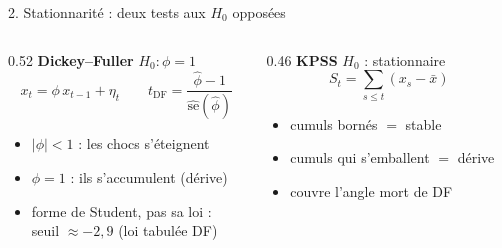 \documentclass[10pt]{beamer}
\begin{document}
\begin{frame}{2. Stationnarité : deux tests aux $H_0$ opposées}
  \begin{columns}[T]
    \begin{column}{0.52\textwidth}
      \small
      \textbf{Dickey--Fuller} \hfill {\footnotesize $H_0 : \phi=1$}
      \[
        x_t = \phi\,x_{t-1}+\eta_t
        \qquad
        t_{\mathrm{DF}} = \frac{\hat\phi - 1}{\widehat{\mathrm{se}}(\hat\phi)}
      \]
      \begin{itemize}\setlength{\itemsep}{1mm}
        \item $|\phi|<1$ : les chocs s'éteignent
        \item $\phi=1$ : ils s'accumulent (dérive)
        \item forme de Student, \alert{pas sa loi} :\\
          seuil $\approx-2{,}9$ (loi tabulée DF)
      \end{itemize}
    \end{column}
    \begin{column}{0.46\textwidth}
      \small
      \textbf{KPSS} \hfill {\footnotesize $H_0$ : stationnaire}
      \[
        S_t=\textstyle\sum_{s\le t}(x_s-\bar x)
      \]
      \begin{itemize}\setlength{\itemsep}{1mm}
        \item cumuls bornés $=$ stable
        \item cumuls qui s'emballent $=$ dérive
        \item couvre l'angle mort de DF
      \end{itemize}
    \end{column}
  \end{columns}
\end{frame}
\end{document}
